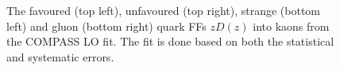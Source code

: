\begin{figure}[!h]
	\caption{The favoured (top left), unfavoured (top right), strange (bottom left) and gluon (bottom right) quark FFs $zD(z)$ into kaons from the COMPASS LO fit. The fit is done based on both the statistical and systematic errors.}
	\label{pic:FFFit}
\end{figure}
